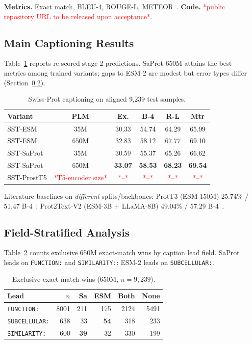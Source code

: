 \documentclass{article}
\newcommand{\tbd}[1]{\textcolor{red}{*#1*}}
\begin{document}
\textbf{Metrics.}
Exact match, BLEU-4, ROUGE-L, METEOR~\cite{papineni2002bleu,lin2004rouge,banerjee2005meteor}.
\textbf{Code.}
\tbd{public repository URL to be released upon acceptance}.

\subsection{Main Captioning Results}

Table~\ref{tab:main-caption} reports re-scored stage-2 predictions.
SaProt-650M attains the best metrics among trained variants; gaps to ESM-2 are modest but error types differ (Section~\ref{sec:analysis}).

\begin{table}[t]
  \caption{Swiss-Prot captioning on aligned 9{,}239 test samples.}
  \label{tab:main-caption}
  \centering
  \small
  \begin{tabular}{lccccc}
    \toprule
    Variant & PLM & Ex. & B-4 & R-L & Mtr \\
    \midrule
    SST-ESM   & 35M  & 30.33 & 54.74 & 64.29 & 65.99 \\
    SST-ESM   & 650M & 32.83 & 58.12 & 67.77 & 69.10 \\
    SST-SaProt& 35M  & 30.59 & 55.37 & 65.26 & 66.62 \\
    SST-SaProt& 650M & \textbf{33.07} & \textbf{58.53} & \textbf{68.23} & \textbf{69.54} \\
    SST-ProstT5 & \tbd{T5-encoder size} & \tbd{--} & \tbd{--} & \tbd{--} & \tbd{--} \\
    \bottomrule
  \end{tabular}
\end{table}

\noindent Literature baselines on \emph{different} splits/backbones: ProtT3 (ESM-150M) 25.74\% / 51.47 B-4~\cite{liu2024prott3}; Prot2Text-V2 (ESM-3B + LLaMA-8B) 49.04\% / 57.29 B-4~\cite{fei2025prot2text}.

\subsection{Field-Stratified Analysis}
\label{sec:analysis}

Table~\ref{tab:field-exact} counts exclusive 650M exact-match wins by caption lead field.
SaProt leads on \texttt{FUNCTION:} and \texttt{SIMILARITY:}; ESM-2 leads on \texttt{SUBCELLULAR:}.

\begin{table}[t]
  \caption{Exclusive exact-match wins (650M, $n{=}9{,}239$).}
  \label{tab:field-exact}
  \centering
  \small
  \begin{tabular}{lrrrrr}
    \toprule
    Lead & $n$ & Sa & ESM & Both & None \\
    \midrule
    \texttt{FUNCTION:}    & 8001 & 211 & 175 & 2124 & 5491 \\
    \texttt{SUBCELLULAR:} &  638 &  33 & \textbf{54} &  318 &  233 \\
    \texttt{SIMILARITY:}  &  600 & \textbf{39} &  32 &  330 &  199 \\
    \bottomrule
  \end{tabular}
\end{table}
\end{document}
